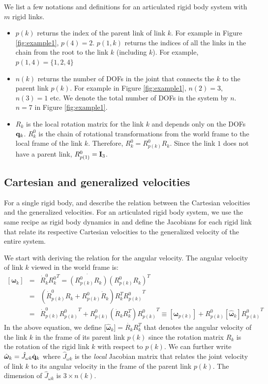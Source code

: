 We list a few notations and definitions for an articulated rigid body system with $m$ rigid links. 
\begin{itemize}
\item $p(k)$ returns the index of the parent link of link $k$. For
  example in Figure \ref{fig:example1}, $p(4) = 2$. $p(1,k)$ returns the indices of all the links in the chain from the root to the link $k$ (including $k$). For example, $p(1,4) = \{1,2,4\}$
\item $n(k)$ returns the number of DOFs in the joint that connects the $k$ to the parent link $p(k)$. For example in Figure \ref{fig:example1}, $n(2) = 3$, $n(3) = 1$ etc. We denote the total number of DOFs in the system by $n$. \eg $n=7$ in Figure \ref{fig:example1}.
\item $R_k$ is the local rotation matrix for the link $k$ and depends only on the DOFs $\mathbf{q}_k$. $R^0_k$ is the chain of rotational transformations from the
  world frame to the local frame of the link $k$. Therefore, $R^0_k = R^0_{p(k)}R_k$. Since the link $1$ does not have a parent link, $R^0_{p(1)} = \mathbf{I}_3$.
\end{itemize}



\subsection{Cartesian and generalized velocities}

For a single rigid body,  and  describe the relation between the Cartesian velocities and the generalized velocities. 
For an articulated rigid body system, we use the same recipe as rigid body dynamics in  and define the Jacobians for each rigid link that relate its respective Cartesian velocities to the generalized velocity of the entire system. 

We start with deriving the relation for the angular velocity. The angular velocity of link $k$ viewed in the world frame is:
\begin{eqnarray}
\nonumber
[\bm{\omega}_k] & = & \dot{R}^0_k {R^0_k}^T = \dot{(R^0_{p(k)}R_k)} (R^0_{p(k)}R_k)^T\\
\nonumber
& = & (\dot{R}^0_{p(k)}R_k + {R^0_{p(k)}}\dot{R}_k)  R_k^T {R^0_{p(k)}}^T \\
\label{eq:angvelk_recursive}
& = & \dot{R}^0_{p(k)}{R^0_{p(k)}}^T + R^0_{p(k)} \left ( \dot{R}_k R_k^T \right ) {R^0_{p(k)}}^T \equiv [\bm{\omega}_{p(k)}] + R^0_{p(k)} [\hat{\bm{\omega}}_k] {R^0_{p(k)}}^T
\end{eqnarray}
In the above equation, we define [$\hat{\bm{\omega}}_k] = \dot{R_k} R_k^T$ that denotes the angular velocity of the link $k$ in the frame of its parent link $p(k)$ since the rotation matrix $R_k$ is the rotation of the rigid link $k$ with respect to $p(k)$. We can further write $\hat{\bm{\omega}}_k = \hat{J}_{\omega k} \dot{\mathbf{q}}_k$ where $\hat{J}_{\omega k}$ is the \emph{local} Jacobian matrix that relates the joint velocity of link $k$ to its angular velocity in the frame of the parent link $p(k)$. The dimension of $\hat{J}_{\omega k}$ is $3\times n(k)$. 

